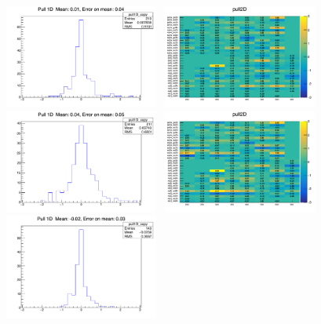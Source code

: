 \begin{figure}[h!]
  \centering
  \includegraphics[width=0.45\textwidth]{figures/btagformula/validation/ValidationSingleMu}~
  \includegraphics[width=0.45\textwidth]{figures/btagformula/validation/ValidationSingleMu2D} \\
  \includegraphics[width=0.45\textwidth]{figures/btagformula/validation/ValidationTTJets}~
  \includegraphics[width=0.45\textwidth]{figures/btagformula/validation/ValidationTTJets2D} \\
  \includegraphics[width=0.45\textwidth]{figures/btagformula/validation/ValidationWJets}~

\end{figure}
